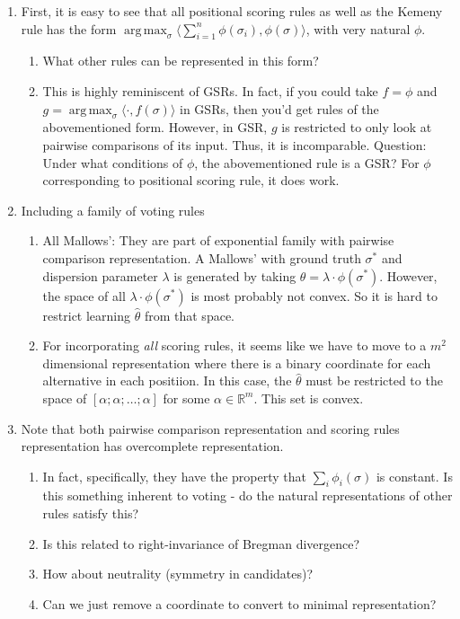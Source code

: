 \documentclass[10pt,letterpaper]{article}
\newcommand{\that}{\hat{\theta}}
\DeclareMathOperator*{\argmax}{arg\,max}
\begin{document}
\begin{enumerate}
\item First, it is easy to see that all positional scoring rules as well as the Kemeny rule has the form $\argmax_{\sigma} \langle \sum_{i=1}^n \phi(\sigma_i), \phi(\sigma) \rangle$, with very natural $\phi$. 
\begin{enumerate}
\item What other rules can be represented in this form?
\item This is highly reminiscent of GSRs. In fact, if you could take $f = \phi$ and $g = \argmax_{\sigma} \langle \cdot , f(\sigma) \rangle$ in GSRs, then you'd get rules of the abovementioned form. However, in GSR, $g$ is restricted to only look at pairwise comparisons of its input. Thus, it is incomparable. Question: Under what conditions of $\phi$, the abovementioned rule is a GSR? For $\phi$ corresponding to positional scoring rule, it does work.
\end{enumerate}

\item Including a family of voting rules
\begin{enumerate}
\item All Mallows': They are part of exponential family with pairwise comparison representation. A Mallows' with ground truth $\sigma^*$ and dispersion parameter $\lambda$ is generated by taking $\theta = \lambda \cdot \phi(\sigma^*)$. However, the space of all $\lambda \cdot \phi(\sigma^*)$ is most probably not convex. So it is hard to restrict learning $\that$ from that space.
\item For incorporating \emph{all} scoring rules, it seems like we have to move to a $m^2$ dimensional representation where there is a binary coordinate for each alternative in each positiion. In this case, the $\that$ must be restricted to the space of $[\alpha; \alpha ; \ldots ;\alpha]$ for some $\alpha \in \mathbb{R}^m$. This set is convex. 
\end{enumerate}

\item Note that both pairwise comparison representation and scoring rules representation has overcomplete representation. 
\begin{enumerate}
\item In fact, specifically, they have the property that $\sum_i \phi_i(\sigma)$ is constant. Is this something inherent to voting - do the natural representations of other rules satisfy this? 
\item Is this related to right-invariance of Bregman divergence? 
\item How about neutrality (symmetry in candidates)? 
\item Can we just remove a coordinate to convert to minimal representation?
\end{enumerate}


\end{enumerate}
\end{document}
